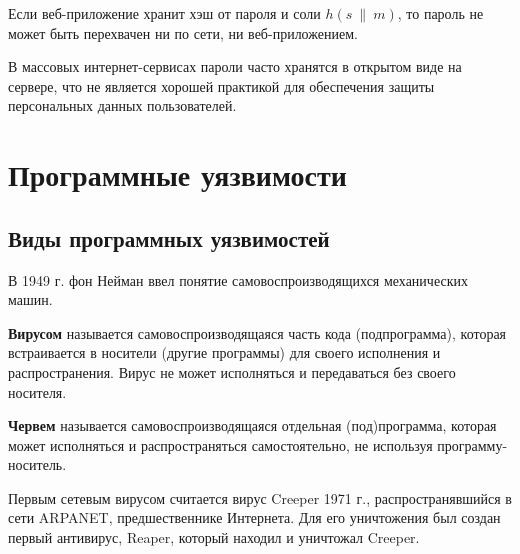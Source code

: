 \documentclass[10pt,a4paper]{book}
\begin{document}
Если веб-приложение хранит хэш от пароля и соли $h(s ~\|~ m)$, то пароль не может быть перехвачен ни по сети, ни веб-приложением.

В массовых интернет-сервисах пароли часто хранятся в открытом виде на сервере, что не является хорошей практикой для обеспечения защиты персональных данных пользователей.






\chapter{Программные уязвимости}





\section{Виды программных уязвимостей}

В 1949 г. фон Нейман ввел понятие самовоспроизводящихся механических машин.

\textbf{Вирусом} называется самовоспроизводящаяся часть кода (подпрограмма), которая встраивается в носители (другие программы) для своего исполнения и распространения. Вирус не может исполняться и передаваться без своего носителя.

\textbf{Червем} называется самовоспроизводящаяся отдельная (под)программа, которая может исполняться и распространяться самостоятельно, не используя программу-носитель.

Первым сетевым вирусом считается вирус Creeper 1971 г., распространявшийся в сети ARPANET, предшественнике Интернета. Для его уничтожения был создан первый антивирус, Reaper, который находил и уничтожал Creeper.
\end{document}
